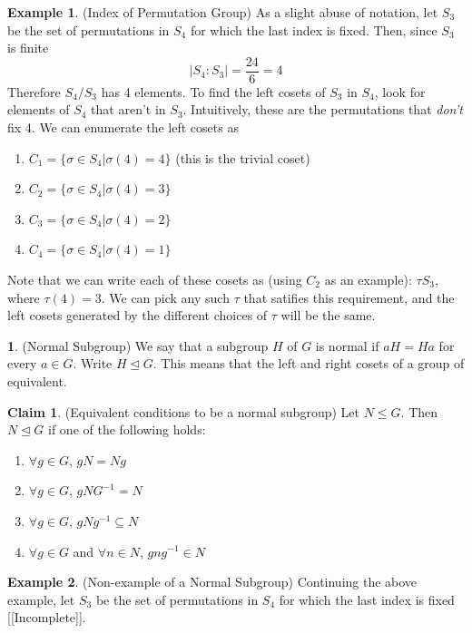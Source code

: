 \documentclass[12pt]{article}
\theoremstyle{definition}
\newtheorem{definition}{\color{NavyBlue}{\textbf{Definition}}}
\newtheorem{claim}{\color{JungleGreen}Claim}
\newtheorem{example}{\color{WildStrawberry}Example}
\theoremstyle{definition}
\begin{document}
\begin{example}(Index of Permutation Group)
As a slight abuse of notation, let $S_3$ be the set of permutations in $S_4$ for which the last index is fixed. Then, since $S_3$ is finite
\begin{equation}
 	|S_4 : S_3| = \frac{24}{6} = 4
\end{equation} 
Therefore $S_4 / S_3$ has 4 elements. To find the left cosets of $S_3$ in $S_4$, look for elements of $S_4$ that aren't in $S_3$. Intuitively, these are the permutations that \textit{don't} fix 4. We can enumerate the left cosets as
\begin{enumerate}
	\item $C_1 = \{\sigma \in S_4 | \sigma(4) = 4 \}$ (this is the trivial coset)
	\item $C_2 = \{\sigma \in S_4 | \sigma(4) = 3 \}$
	\item $C_3 = \{\sigma \in S_4 | \sigma(4) = 2 \}$
	\item $C_4 = \{\sigma \in S_4 | \sigma(4) = 1 \}$
\end{enumerate}
Note that we can write each of these cosets as (using $C_2$ as an example): $\tau S_3$, where $\tau(4) = 3$. We can pick any such $\tau$ that satifies this requirement, and the left cosets generated by the different choices of $\tau$ will be the same.
\end{example}

\begin{definition}(Normal Subgroup)
We say that a subgroup $H$ of $G$ is normal if $aH = Ha$ for every $a \in G$. Write $H \trianglelefteq G$. This means that the left and right cosets of a group of equivalent.
\end{definition}

\begin{claim}(Equivalent conditions to be a normal subgroup)
Let $N \leq G$. Then $N \trianglelefteq G$ if one of the following holds:
\begin{enumerate}
	\item $\forall g\in G$, $gN = Ng$
	\item $\forall g\in G$, $gNG^{-1} = N$
	\item $\forall g\in G$, $gNg^{-1} \subseteq N$
	\item $\forall g\in G$ and $\forall n\in N$, $gng^{-1} \in N$
\end{enumerate}
\end{claim}

\begin{example}(Non-example of a Normal Subgroup)
Continuing the above example, let $S_3$ be the set of permutations in $S_4$ for which the last index is fixed [[Incomplete]].
\end{example}
\end{document}
